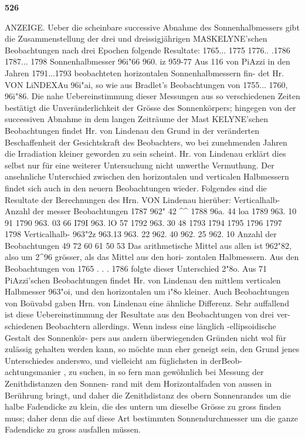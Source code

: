 \documentclass[12pt,a4paper]{article}
\begin{document}

\noindent\textbf{526}

ANZEIGE. Ueber  die  scheinbare  successive  Abnahme  des  Sonnenhalbmessers  gibt  die  Zusammenstellung  der drei  und  dreissigjährigen  MASKELYNE'schen  Beobachtungen  nach  drei  Epochen  folgende  Resultate: 1765... 1775 1776.. .1786 1787... 1798 Sonnenhalbmesser 96i"66 960. iz 959-77 Aus  116  von  PiAzzi  in  den  Jahren  1791...1793  beobachteten  horizontalen  Sonnenhalbmessern  fin- det Hr.  VON  LiNDEXAu  96i"ai,  so  wie  aus  Bradlet's  Beobachtungen  von  1755...  1760,  96i"86.  Die  nahe Uebereinstimmung  dieser  Messungen  aus  so  verschiedenen  Zeiten  bestätigt  die  Unveränderlichkeit  der Grösse  des  Sonnenkörpers;  hingegen  von  der  successiven  Abnahme  in  dem  langen  Zeiträume  der  Mast KELYNE'schen  Beobachtungen  findet  Hr.  von  Lindenau  den  Grund  in  der  veränderten  Beschaffenheit  der Gesichtskraft  des  Beobachters,  wo  bei  zunehmenden  Jahren  die  Irradiation  kleiner  geworden  zu  sein scheint.  Hr.  von  Lindenau  erklärt  dies  selbst  nur  für  eine  weiterer  Untersuchung  nicht  unwerthe Vermuthung. Der  ansehnliche  Unterschied  zwischen  den  horizontalen  und  verticalen  Halbmessern  findet  sich auch  in  den  neuern  Beobachtungen  wieder.  Folgendes  sind  die  Resultate  der  Berechnungen  des  Hrn. VON  Lindenau  hierüber: Verticalhalb- Anzahl  der messer Beobachtungen 1787 962" 42 \textasciicircum{}\textasciicircum{} 1788 96a.  44 loa 1789 963. 10 91 1790 963.  03 66 I79I 963. lO 57 1792 963.  30 48 1793 1794 1795 1796 1797 1798 Verticalhalb- 963"2z 963.13 963.  22 962.  40 962.  25 962. 10 Anzahl  der Beobachtungen 49 72 60 61 50 53 Das  arithmetische  Mittel  aus  allen  ist  962"82,  also  um  2\textasciicircum{}96  grösser,  als  das  Mittel  aus  den  hori- zontalen Halbmessern.  Aus  den  Beobachtungen  von  1765  . . .  1786  folgte  dieser  Unterschied  2"8o.  Aus 71  PiAzzi'schen  Beobachtungen  findet  Hr.  von  Lindenau  den  mittlem  verticalen  Halbmesser  963"oi,  und den  horizontalen  um  i"8o  kleiner.  Auch  Beobachtungen  von  Boüvabd  gaben  Hrn.  von  Lindenau  eine ähnliche  Differenz. Sehr  auffallend  ist  diese  Uebereinstimmung  der  Resultate  aus  den  Beobachtungen  von  drei  ver- schiedenen Beobachtern  allerdings.  Wenn  indess  eine  länglich -ellipsoidische  Gestalt  des  Sonnenkör- pers aus  andern  überwiegenden  Gründen  nicht  wol  für  zulässig  gehalten  werden  kann,  so  möchte  man eher  geneigt  sein,  den  Grund  jenes  Unterschiedes  anderswo,  und  vielleicht  am  füglichsten  in  derBeob- achtungsmanier ,  zu  suchen,  in  so  fern  man  gewöhnlich  bei  Messung  der  Zenithdistanzen  den  Sonnen- rand mit  dem  Horizontalfaden  von  aussen  in  Berührung  bringt,  und  daher  die  Zenithdistanz  des  obern Sonnenrandes  um  die  halbe  Fadendicke  zu  klein,  die  des  untern  um  dieselbe  Grösse  zu  gross  finden muss;  daher  denn  die  auf  diese  Art  bestimmten  Sonnendurchmesser  um  die  ganze  Fadendicke  zu  gross ausfallen  müssen.
\end{document}
